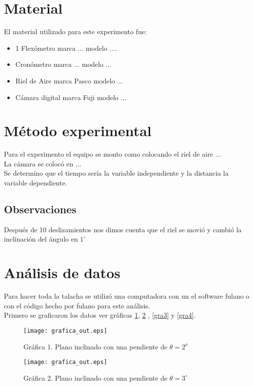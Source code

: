 \documentclass[12pt,letterpaper]{article}
\begin{document}
\section{Material}
El material utilizado para este experimento fue:
\begin{itemize}
\item 1 Flexómetro marca ... modelo ....
\item Cronómetro marca ...  modelo ...
\item Riel de Aire marca Pasco modelo ...
\item Cámara digital marca Fuji modelo ...
\end{itemize}
\section{Método experimental}

Para el experimento el equipo se monto como colocando el riel de aire ...\\
La cámara se colocó  en ...\\
Se determino que el tiempo sería la variable independiente y la distancia la variable dependiente.
\subsection{Observaciones}


Después de 10 deslizamientos nos dimos cuenta que el riel se movió y cambió la inclinación del ángulo en $1^{\circ}$
\section{Análisis de datos}

Para hacer toda la talacha se utilizó una computadora con un el software fulano o con el código hecho  por fulano para este análisis.\\
Primero se graficaron los datos ver gráficas \ref{gra1}, \ref{gra2} , \ref{gra3} y \ref{gra4}. 

\begin{figure}[!h]

\begin{center}
\texttt{[image: grafica\_out.eps]} 
\caption{Gráfica 1. Plano inclinado con una pendiente de $\theta= 2^{o}$}\label{gra1}
\end{center}
\end{figure}
\begin{figure}[!h]

\begin{center}
\texttt{[image: grafica\_out.eps]} 
\caption{Gráfica 2. Plano inclinado con una pendiente de $\theta= 3^{\circ}$}\label{gra2}
\end{center}
\end{figure}
\end{document}
